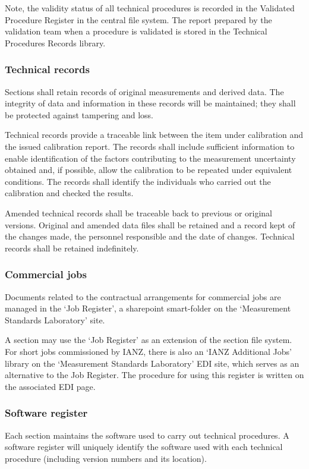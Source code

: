 Note, the validity status of all technical procedures is recorded in the Validated Procedure Register in the central file system. The report prepared by the validation team when a procedure is validated is stored in the Technical Procedures Records library.

\subsubsection{Technical records}
Sections shall retain records of original measurements and derived data. The integrity of data and information in these records will be maintained; they shall be protected against tampering and loss.

Technical records provide a traceable link between the item under calibration and the issued calibration report. The records shall include sufficient information to enable identification of the factors contributing to the measurement uncertainty obtained and, if possible, allow the calibration to be repeated under equivalent conditions. The records shall identify the individuals who carried out the calibration and checked the results. 

Amended technical records shall be traceable back to previous or original versions. Original and amended data files shall be retained and a record kept of the changes made, the personnel responsible and the date of changes.
Technical records shall be retained indefinitely.

\subsubsection{Commercial jobs}
Documents related to the contractual arrangements for commercial jobs are managed in the ‘Job Register', a sharepoint smart-folder on the ‘Measurement Standards Laboratory' site. 

A section may use the ‘Job Register' as an extension of the section file system. 
For short jobs commissioned by IANZ, there is also an ‘IANZ Additional Jobs' library on the ‘Measurement Standards Laboratory' EDI site, which serves as an alternative to the Job Register. The procedure for using this register is written on the associated EDI page. 

\subsubsection{Software register}
Each section maintains the software used to carry out technical procedures. 
A software register will uniquely identify the software used with each technical procedure (including version numbers and its location). 

